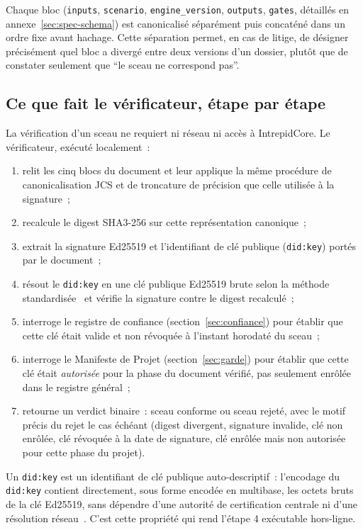 \documentclass[11pt,a4paper]{article}
\begin{document}
Chaque bloc (\texttt{inputs}, \texttt{scenario}, \texttt{engine\_version}, \texttt{outputs}, \texttt{gates}, détaillés en annexe~\ref{sec:spec-schema}) est canonicalisé séparément puis concaténé dans un ordre fixe avant hachage. Cette séparation permet, en cas de litige, de désigner précisément quel bloc a divergé entre deux versions d'un dossier, plutôt que de constater seulement que \enquote{le sceau ne correspond pas}.

\subsection{Ce que fait le vérificateur, étape par étape}\label{sec:verif}

La vérification d'un sceau ne requiert ni réseau ni accès à IntrepidCore. Le vérificateur, exécuté localement~:

\begin{enumerate}[leftmargin=1.4em, itemsep=2pt]
  \item relit les cinq blocs du document et leur applique la même procédure de canonicalisation JCS et de troncature de précision que celle utilisée à la signature~;
  \item recalcule le digest SHA3-256 sur cette représentation canonique~;
  \item extrait la signature Ed25519 et l'identifiant de clé publique (\texttt{did:key}) portés par le document~;
  \item résout le \texttt{did:key} en une clé publique Ed25519 brute selon la méthode standardisée~\cite{w3c_did_key} et vérifie la signature contre le digest recalculé~;
  \item interroge le registre de confiance (section~\ref{sec:confiance}) pour établir que cette clé était valide et non révoquée à l'instant horodaté du sceau~;
  \item interroge le Manifeste de Projet (section~\ref{sec:garde}) pour établir que cette clé était \emph{autorisée} pour la phase du document vérifié, pas seulement enrôlée dans le registre général~;
  \item retourne un verdict binaire~: sceau conforme ou sceau rejeté, avec le motif précis du rejet le cas échéant (digest divergent, signature invalide, clé non enrôlée, clé révoquée à la date de signature, clé enrôlée mais non autorisée pour cette phase du projet).
\end{enumerate}

Un \texttt{did:key} est un identifiant de clé publique auto-descriptif~: l'encodage du \texttt{did:key} contient directement, sous forme encodée en multibase, les octets bruts de la clé Ed25519, sans dépendre d'une autorité de certification centrale ni d'une résolution réseau~\cite{w3c_did_key}. C'est cette propriété qui rend l'étape 4 exécutable hors-ligne.
\end{document}

